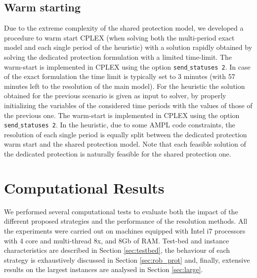 \documentclass[final,5p,times,twocolumn]{elsarticle}
\begin{document}
\subsection{Warm starting}
Due to the extreme complexity of the shared protection model, we developed a procedure to warm start CPLEX (when solving both the multi-period exact model and each single period of the heuristic) with a solution rapidly obtained by solving the dedicated protection formulation with a limited time-limit. The warm-start is implemented in CPLEX using the option {\tt send$\_$statuses 2}. In case of the exact formulation the time limit is typically set to 3 minutes (with 57 minutes left to the resolution of the main model). For the heuristic the solution obtained for the previous scenario is given as input to solver, by properly initializing the variables of the considered time periods with the values of those of the previous one. The warm-start is implemented in CPLEX using the option {\tt send$\_$statuses 2}. In the heuristic, due to some AMPL code constraints, the resolution of each single period is equally split between the dedicated protection warm start and the shared protection model. Note that each feasible solution of the dedicated protection is naturally feasible for the shared protection one. 




\section{Computational Results}\label{sec:results}
We performed several computational tests to evaluate both the impact of the different proposed strategies and the performance of the resolution methods. All the experiments were carried out on machines equipped with Intel i7 processors with 4 core and multi-thread 8x, and 8Gb of RAM. Test-bed and instance characteristics are described in Section \ref{sec:testbed}, the behaviour of each strategy is exhaustively discussed in Section \ref{sec:rob_prot} and, finally, extensive results on the largest instances are analysed in Section \ref{sec:large}.

\renewcommand\arraystretch{1.1}
\end{document}
